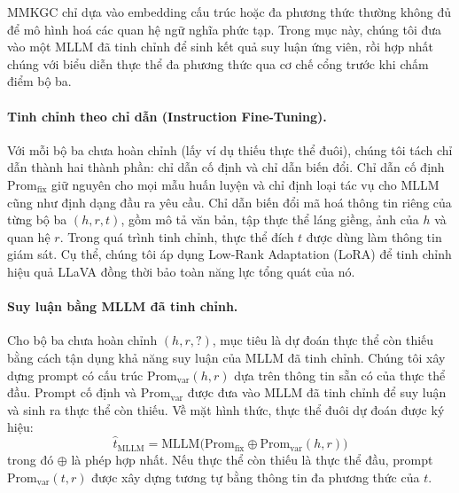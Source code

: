 \documentclass[10pt,twocolumn,a4paper]{article}
\newcommand{\Prom}{\mathrm{Prom}}
\begin{document}
MMKGC chỉ dựa vào embedding cấu trúc hoặc đa phương thức thường không đủ để mô hình hoá các quan hệ ngữ nghĩa phức tạp. Trong mục này, chúng tôi đưa vào một MLLM đã tinh chỉnh để sinh kết quả suy luận ứng viên, rồi hợp nhất chúng với biểu diễn thực thể đa phương thức qua cơ chế cổng trước khi chấm điểm bộ ba.

\paragraph{Tinh chỉnh theo chỉ dẫn (Instruction Fine-Tuning).}
Với mỗi bộ ba chưa hoàn chỉnh (lấy ví dụ thiếu thực thể đuôi), chúng tôi tách chỉ dẫn thành hai thành phần: chỉ dẫn cố định và chỉ dẫn biến đổi. Chỉ dẫn cố định $\Prom_{\mathrm{fix}}$ giữ nguyên cho mọi mẫu huấn luyện và chỉ định loại tác vụ cho MLLM cũng như định dạng đầu ra yêu cầu. Chỉ dẫn biến đổi mã hoá thông tin riêng của từng bộ ba $(h, r, t)$, gồm mô tả văn bản, tập thực thể láng giềng, ảnh của $h$ và quan hệ $r$. Trong quá trình tinh chỉnh, thực thể đích $t$ được dùng làm thông tin giám sát. Cụ thể, chúng tôi áp dụng Low-Rank Adaptation (LoRA) để tinh chỉnh hiệu quả LLaVA đồng thời bảo toàn năng lực tổng quát của nó.

\paragraph{Suy luận bằng MLLM đã tinh chỉnh.}
Cho bộ ba chưa hoàn chỉnh $(h, r, ?)$, mục tiêu là dự đoán thực thể còn thiếu bằng cách tận dụng khả năng suy luận của MLLM đã tinh chỉnh. Chúng tôi xây dựng prompt có cấu trúc $\Prom_{\mathrm{var}}(h, r)$ dựa trên thông tin sẵn có của thực thể đầu. Prompt cố định và $\Prom_{\mathrm{var}}$ được đưa vào MLLM đã tinh chỉnh để suy luận và sinh ra thực thể còn thiếu. Về mặt hình thức, thực thể đuôi dự đoán được ký hiệu:
\begin{equation}
\hat{t}_{\mathrm{MLLM}} = \mathrm{MLLM}\big(\Prom_{\mathrm{fix}} \oplus \Prom_{\mathrm{var}}(h, r)\big)
\label{eq:5}
\end{equation}
trong đó $\oplus$ là phép hợp nhất. Nếu thực thể còn thiếu là thực thể đầu, prompt $\Prom_{\mathrm{var}}(t, r)$ được xây dựng tương tự bằng thông tin đa phương thức của $t$.
\end{document}
